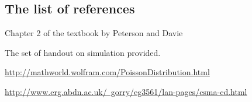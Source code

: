 \subsection{The list of references}
\begin{description}
\item Chapter 2 of the textbook by Peterson and Davie
\item The set of handout on simulation provided.
\item \href{http://mathworld.wolfram.com/PoissonDistribution.html}{http://mathworld.wolfram.com/PoissonDistribution.html}
\item \href{http://www.erg.abdn.ac.uk/~gorry/eg3561/lan-pages/csma-cd.html}{http://www.erg.abdn.ac.uk/~gorry/eg3561/lan-pages/csma-cd.html}
\end{description}

